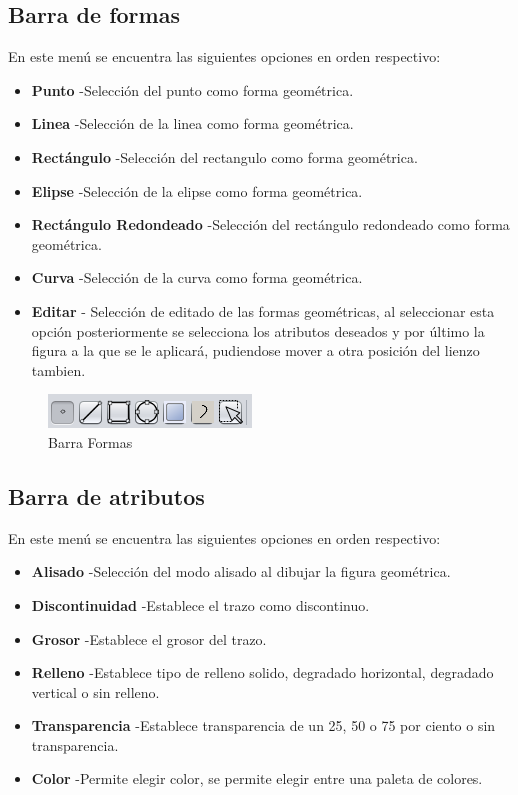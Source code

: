 \subsection{Barra de formas}
En este menú se encuentra las siguientes opciones en orden respectivo:
\begin{itemize}
\item \textbf{Punto} -Selección del punto como forma geométrica.
\item \textbf{Linea} -Selección de la linea como forma geométrica.
\item \textbf{Rectángulo} -Selección del rectangulo como forma geométrica.
\item \textbf{Elipse} -Selección de la elipse como forma geométrica.
\item \textbf{Rectángulo Redondeado} -Selección del rectángulo redondeado como forma geométrica. 
\item \textbf{Curva} -Selección de la curva como forma geométrica.
\item \textbf{Editar} - Selección de editado de las formas geométricas, al seleccionar esta opción posteriormente se selecciona los atributos deseados y por último la figura a la que se le aplicará, pudiendose mover a otra posición del lienzo tambien.

\end{itemize}


\begin{figure}[H]
  \centering
    \includegraphics[scale=0.80]{images/barraformas}
  \caption{Barra Formas}
  \label{Barra Formas}
\end{figure}


\subsection{Barra de atributos}
En este menú se encuentra las siguientes opciones en orden respectivo:
\begin{itemize}
\item \textbf{Alisado} -Selección del modo alisado al dibujar la figura geométrica.
\item \textbf{Discontinuidad} -Establece el trazo como discontinuo.
\item \textbf{Grosor} -Establece el grosor del trazo.
\item \textbf{Relleno} -Establece tipo de relleno solido, degradado horizontal, degradado vertical o sin relleno.
\item \textbf{Transparencia} -Establece transparencia de un 25, 50 o 75 por ciento o sin transparencia. 
\item \textbf{Color} -Permite elegir color, se permite elegir entre una paleta de colores.

\end{itemize}


